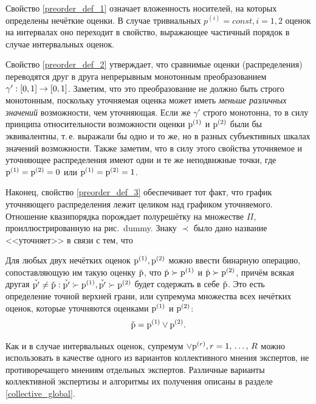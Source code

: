 	Свойство \eqref{preorder_def_1} означает вложенность носителей, на которых определены нечёткие оценки. В случае тривиальных $p^{(i)} = const, i=1,2$  оценок на интервалах оно переходит в свойство, выражающее частичный порядок в случае интервальных оценок.
	
	Свойство \eqref{preorder_def_2} утверждает, что сравнимые оценки (распределения) переводятся друг в друга непрерывным монотонным преобразованием $\gamma': [0,1] \rightarrow [0,1]$. Заметим, что это преобразование не должно быть строго монотонным, поскольку уточняемая оценка может иметь {\sl меньше различных значений} возможности, чем уточняющая. Если же $\gamma'$ строго монотонна, то в силу принципа относительности возможности оценки ${\mathrm{p}}^{(1)}$ и ${\mathrm{p}}^{(2)}$ были бы эквивалентны, т.\,е. выражали бы одно и то же, но в разных субъективных шкалах значений возможности. Также заметим, что в силу этого свойства уточняемое и уточняющее распределения имеют одни и те же неподвижные точки, где ${\mathrm{p}}^{(1)} = {\mathrm{p}}^{(2)} = 0$ или ${\mathrm{p}}^{(1)} = {\mathrm{p}}^{(2)} = 1$. 
	
	Наконец, свойство \eqref{preorder_def_3} обеспечивает тот факт, что график уточняющего распределения лежит целиком над графиком уточняемого. Отношение квазипорядка порождает полурешётку на множестве $\Pi$, проиллюстрированную на рис.~dummy. Знаку $\prec$ было дано название <<уточняет>> в связи с тем, что 
	
Для любых двух нечётких оценок ${\mathrm{p}}^{(1)}, {\mathrm{p}}^{(2)}$ можно ввести бинарную операцию, сопоставляющую им такую оценку $\check{{\mathrm{p}}}$, что $\check{{\mathrm{p}}} \succ {\mathrm{p}}^{(1)}$ и $\check{{\mathrm{p}}} \succ {\mathrm{p}}^{(2)}$, причём всякая другая $\check{{\mathrm{p}}'} \neq \check{{\mathrm{p}}}: \check{{\mathrm{p}}'} \succ {\mathrm{p}}^{(1)}, \check{{\mathrm{p}}'} \succ {\mathrm{p}}^{(2)}$ будет содержать в себе $\check{{\mathrm{p}}}$. Это есть определение точной верхней грани, или супремума множества всех нечётких оценок, которые уточняются оценками ${\mathrm{p}}^{(1)}$ и ${\mathrm{p}}^{(2)}$:
\begin{equation*}
   \check{{\mathrm{p}}} = {\mathrm{p}}^{(1)}\vee {\mathrm{p}}^{(2)}.
\end{equation*}

Как и в случае интервальных оценок, супремум $\vee {\mathrm{p}}^{(r)}, r = 1,\, \ldots,\, R$ можно использовать в качестве одного из вариантов коллективного мнения экспертов, не противоречащего мнениям отдельных экспертов. Различные варианты коллективной экспертизы и алгоритмы их получения описаны в разделе \ref{collective_global}.
	
